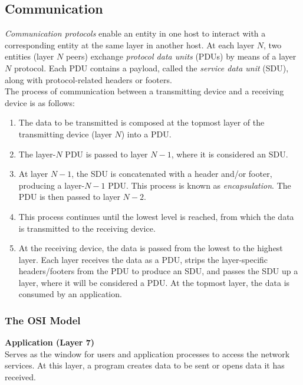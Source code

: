 \documentclass[12pt, titlepage]{article}
\begin{document}
\subsection{Communication}

\textit{Communication protocols} enable an entity in one host to interact with a corresponding entity at the same layer in another host. At each layer $N$, two entities (layer $N$ peers) exchange \textit{protocol data units} (PDUs) by means of a layer $N$ protocol. Each PDU contains a payload, called the \textit{service data unit} (SDU), along with protocol-related headers or footers. \\

The process of communication between a transmitting device and a receiving device is as follows:

\begin{enumerate}
  \item The data to be transmitted is composed at the topmost layer of the transmitting device (layer $N$) into a PDU.
  \item The layer-$N$ PDU is passed to layer $N-1$, where it is considered an SDU.
  \item At layer $N-1$, the SDU is concatenated with a header and/or footer, producing a layer-$N-1$ PDU. This process is known as \textit{encapsulation}. The PDU is then passed to layer $N-2$.
  \item This process continues until the lowest level is reached, from which the data is transmitted to the receiving device.
  \item At the receiving device, the data is passed from the lowest to the highest layer. Each layer receives the data as a PDU, strips the layer-specific headers/footers from the PDU to produce an SDU, and passes the SDU up a layer, where it will be considered a PDU. At the topmost layer, the data is consumed by an application.
\end{enumerate}

\subsubsection{The OSI Model}

\textbf{Application (Layer 7)} \\

Serves as the window for users and application processes to access the network services. At this layer, a program creates data to be sent or opens data it has received. \\
\end{document}
